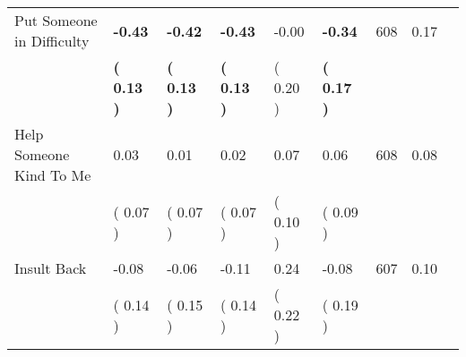 \begin{tabular}{L{6.2cm} C{1.8cm} C{1.8cm} C{1.8cm} C{1.8cm} C{1.8cm} C{1.8cm} C{0.3cm} C{0.3cm}}
Put Someone in Difficulty & \textbf{    -0.43} & \textbf{    -0.42} & \textbf{    -0.43} &     -0.00 & \textbf{    -0.34}  & 608 &       0.17 \\ 
 & \textbf{(     0.13 )} & \textbf{(     0.13 )} & \textbf{(     0.13 )} & (     0.20 ) & \textbf{(     0.17 )}  & \\
Help Someone Kind To Me &      0.03 &      0.01 &      0.02 &      0.07 &      0.06  & 608 &       0.08 \\ 
 & (     0.07 ) & (     0.07 ) & (     0.07 ) & (     0.10 ) & (     0.09 )  & \\
Insult Back &     -0.08 &     -0.06 &     -0.11 &      0.24 &     -0.08  & 607 &       0.10 \\ 
 & (     0.14 ) & (     0.15 ) & (     0.14 ) & (     0.22 ) & (     0.19 )  & \\
\bottomrule
\end{tabular}
